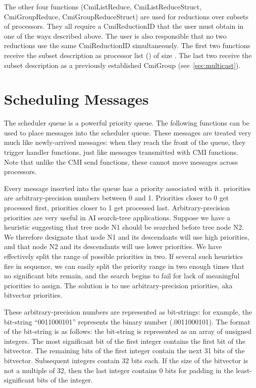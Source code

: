 The other four functions (CmiListReduce, CmiListReduceStruct, CmiGroupReduce,
CmiGroupReduceStruct) are used for reductions over subsets of processors. They
all require a CmiReductionID that the user must obtain in one of the ways
described above. The user is also responsible that no two reductions use the
same CmiReductionID simultaneously. The first two functions receive the subset
description as processor list () of size . The last two receive
the subset description as a previously established CmiGroup
(see~\ref{sec:multicast}).

\section{Scheduling Messages}
\label{schedqueue}

The scheduler queue is a powerful priority queue.  The following
functions can be used to place messages into the scheduler queue.
These messages are treated very much like newly-arrived messages: when
they reach the front of the queue, they trigger handler functions,
just like messages transmitted with CMI functions.  Note that unlike
the CMI send functions, these cannot move messages across processors.

Every message inserted into the queue has a priority associated with
it.  \converse{} priorities are arbitrary-precision numbers between 0 and
1.  Priorities closer to 0 get processed first, priorities closer to 1
get processed last.  Arbitrary-precision priorities are very useful in
AI search-tree applications. Suppose we have a heuristic suggesting
that tree node N1 should be searched before tree node N2. We therefore
designate that node N1 and its descendants will use high priorities,
and that node N2 and its descendants will use lower priorities. We
have effectively split the range of possible priorities in two. If
several such heuristics fire in sequence, we can easily split the
priority range in two enough times that no significant bits remain,
and the search begins to fail for lack of meaningful priorities to
assign. The solution is to use arbitrary-precision priorities, aka
bitvector priorities.

These arbitrary-precision numbers are represented as bit-strings: for
example, the bit-string ``0011000101'' represents the binary number
(.0011000101).  The format of the bit-string is as follows: the
bit-string is represented as an array of unsigned integers. The most
significant bit of the first integer contains the first bit of the
bitvector.  The remaining bits of the first integer contain the next
31 bits of the bitvector.  Subsequent integers contain 32 bits
each. If the size of the bitvector is not a multiple of 32, then the
last integer contains 0 bits for padding in the least-significant bits
of the integer.

